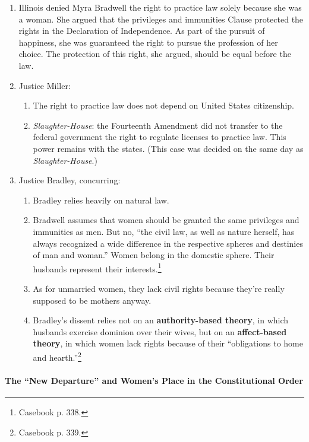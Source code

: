 \begin{enumerate}
    \item Illinois denied Myra Bradwell the right to practice law solely 
    because she was a woman. She argued that the privileges and immunities 
    Clause protected the rights in the Declaration of Independence. As part of 
    the pursuit of happiness, she was guaranteed the right to pursue the 
    profession of her choice. The protection of this right, she argued, should 
    be equal before the law.
    \item Justice Miller:
    \begin{enumerate}
        \item The right to practice law does not depend on United States 
        citizenship.
        \item \emph{Slaughter-House}: the Fourteenth Amendment did not 
        transfer to the federal government the right to regulate licenses to 
        practice law. This power remains with the states. (This case was 
        decided on the same day as \emph{Slaughter-House}.)
    \end{enumerate}
    \item Justice Bradley, concurring:
    \begin{enumerate}
        \item Bradley relies heavily on natural law.
        \item Bradwell assumes that women should be granted the same 
        privileges and immunities as men. But no, ``the civil law, as well as 
        nature herself, has always recognized a wide difference in the 
        respective spheres and destinies of man and woman.'' Women belong in 
        the domestic sphere. Their husbands represent their 
        interests.\footnote{Casebook p. 338.}
        \item As for unmarried women, they lack civil rights because they're 
        really supposed to be mothers anyway.
        \item Bradley's dissent relies not on an \textbf{authority-based 
        theory}, in which husbands exercise dominion over their wives, but on 
        an \textbf{affect-based theory}, in which women lack rights because of 
        their ``obligations to home and hearth.''\footnote{Casebook p. 339.}
    \end{enumerate}
\end{enumerate}

\paragraph{The ``New Departure'' and Women's Place in the Constitutional 
Order}

